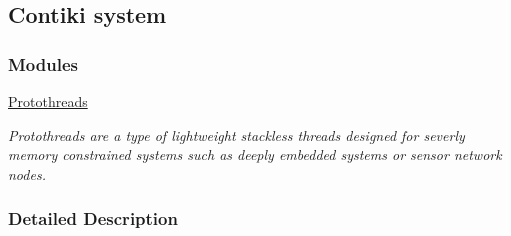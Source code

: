 \hypertarget{a00071}{}\subsection{Contiki system}
\label{a00071}
\subsubsection*{Modules}
\begin{DoxyCompactItemize}
\item 
\hyperlink{a00066}{Protothreads}
\begin{DoxyCompactList}\small\item\em Protothreads are a type of lightweight stackless threads designed for severly memory constrained systems such as deeply embedded systems or sensor network nodes. \end{DoxyCompactList}\end{DoxyCompactItemize}


\subsubsection{Detailed Description}
